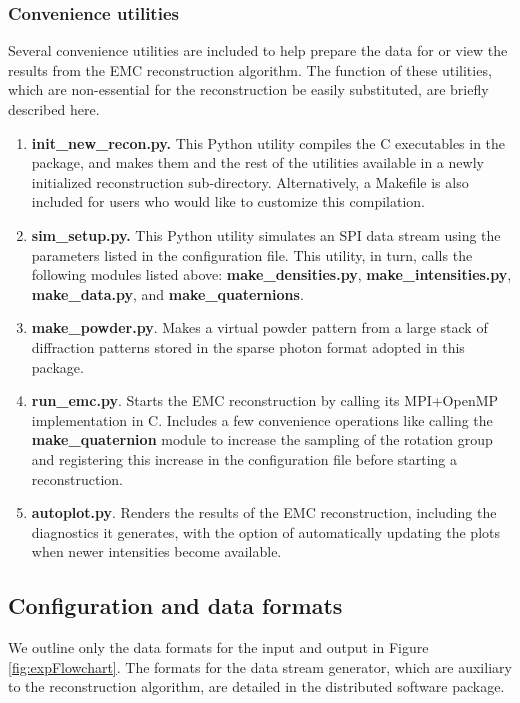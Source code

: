 \documentclass[]{iucr}              %
\begin{document}
\subsubsection{Convenience utilities}\label{subsubsec:utils}
Several convenience utilities are included to help prepare the data for or view the results from the EMC reconstruction algorithm. The function of these utilities, which are non-essential for the reconstruction be easily substituted, are briefly described here. 
\begin{enumerate}
\item{\bf init\_new\_recon.py.} This Python utility compiles the C executables in the package, and makes them and the rest of the utilities available in a newly initialized reconstruction sub-directory. Alternatively, a Makefile is also included for users who would like to customize this compilation.
\item{\bf sim\_setup.py.} This Python utility simulates an SPI data stream using the parameters listed in the configuration file. This utility, in turn, calls the following modules listed above: {\bf make\_densities.py}, {\bf make\_intensities.py}, {\bf make\_data.py}, and {\bf make\_quaternions}.
\item{\bf make\_powder.py}. Makes a virtual powder pattern from a large stack of diffraction patterns stored in the sparse photon format adopted in this package.
\item{\bf run\_emc.py}. Starts the EMC reconstruction by calling its MPI+OpenMP implementation in C. Includes a few convenience operations like calling the {\bf make\_quaternion} module to increase the sampling of the rotation group and registering this increase in the configuration file before starting a reconstruction.
\item{\bf autoplot.py}. Renders the results of the EMC reconstruction, including the diagnostics it generates, with the option of automatically updating the plots when newer intensities become available.
\end{enumerate}


\subsection{Configuration and data formats}\label{subsec:formats}

We outline only the data formats for the input and output in Figure \ref{fig:expFlowchart}. The formats for the data stream generator, which are auxiliary to the reconstruction algorithm, are detailed in the distributed software package. 
\end{document}
